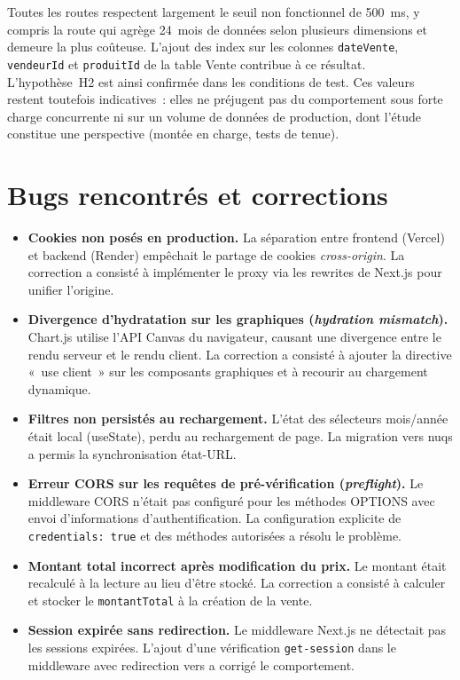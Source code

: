 \documentclass[11pt,a4paper]{report}
\begin{document}
Toutes les routes respectent largement le seuil non fonctionnel de 500~ms, y
compris la route  qui agrège 24~mois de données selon
plusieurs dimensions et demeure la plus coûteuse. L'ajout des index sur les
colonnes \texttt{dateVente}, \texttt{vendeurId} et \texttt{produitId} de la
table Vente contribue à ce résultat. L'hypothèse~H2 est ainsi confirmée dans les
conditions de test. Ces valeurs restent toutefois indicatives~: elles ne
préjugent pas du comportement sous forte charge concurrente ni sur un volume de
données de production, dont l'étude constitue une perspective (montée en
charge, tests de tenue).

\section{Bugs rencontrés et corrections}
\begin{itemize}
  \item \textbf{Cookies non posés en production.} La séparation entre frontend
        (Vercel) et backend (Render) empêchait le partage de cookies
        \textit{cross-origin}. La correction a consisté à implémenter le proxy
        via les rewrites de Next.js pour unifier l'origine.
  \item \textbf{Divergence d'hydratation sur les graphiques
        (\emph{hydration mismatch}).} Chart.js utilise l'API Canvas du
        navigateur, causant une divergence entre le rendu serveur et le rendu
        client. La correction a consisté à ajouter la directive «~use client~»
        sur les composants graphiques et à recourir au chargement dynamique.
  \item \textbf{Filtres non persistés au rechargement.} L'état des sélecteurs
        mois/année était local (useState), perdu au rechargement de page. La
        migration vers nuqs a permis la synchronisation état-URL.
  \item \textbf{Erreur CORS sur les requêtes de pré-vérification
        (\emph{preflight}).} Le middleware CORS n'était pas configuré pour les
        méthodes OPTIONS avec envoi d'informations d'authentification. La
        configuration explicite de \texttt{credentials: true} et des méthodes
        autorisées a résolu le problème.
  \item \textbf{Montant total incorrect après modification du prix.} Le montant
        était recalculé à la lecture au lieu d'être stocké. La correction a
        consisté à calculer et stocker le \texttt{montantTotal} à la création de
        la vente.
  \item \textbf{Session expirée sans redirection.} Le middleware Next.js ne
        détectait pas les sessions expirées. L'ajout d'une vérification
        \texttt{get-session} dans le middleware avec redirection vers
         a corrigé le comportement.
\end{itemize}
\end{document}
